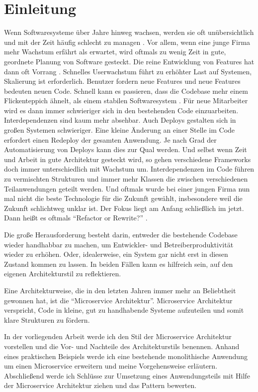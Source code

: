 \chapter{Einleitung}
Wenn Softwaresysteme über Jahre hinweg wachsen, werden sie oft unübersichtlich und mit der Zeit häufig schlecht zu managen \cite{infaktuell}. Vor allem, wenn eine junge Firma mehr Wachstum erfährt als erwartet, wird oftmals zu wenig Zeit in gute, geordnete Planung von Software gesteckt. Die reine Entwicklung von Features hat dann oft Vorrang \cite{mckinsey}. Schnelles Userwachstum führt zu erhöhter Last auf Systemen, Skalierung ist erforderlich. Benutzer fordern neue Features und neue Features bedeuten neuen Code. Schnell kann es passieren, dass die Codebase mehr einem Flickenteppich ähnelt, als einem stabilen Softwaresystem \cite[vgl.][Seite 7]{highsmith2013adaptive}. Für neue Mitarbeiter wird es dann immer schwieriger sich in den bestehenden Code einzuarbeiten. Interdependenzen sind kaum mehr absehbar. Auch Deploys gestalten sich in großen Systemen schwieriger. Eine kleine Änderung an einer Stelle im Code erfordert einen Redeploy der gesamten Anwendung. Je nach Grad der Automatisierung von Deploys kann dies zur Qual werden. Und selbst wenn Zeit und Arbeit in gute Architektur gesteckt wird, so gehen verschiedene Frameworks doch immer unterschiedlich mit Wachstum um. Interdependenzen im Code führen zu vermischten Strukturen und immer mehr Klassen die zwischen verschiedenen Teilanwendungen geteilt werden. Und oftmals wurde bei einer jungen Firma nun mal nicht die beste Technologie für die Zukunft gewählt, insbesondere weil die Zukunft schlichtweg unklar ist. Der Fokus liegt am Anfang schließlich im jetzt. Dann heißt es oftmals \enquote{Refactor or Rewrite?} \cite[vgl.][]{refactorrewrite}.

Die große Herausforderung besteht darin, entweder die bestehende Codebase wieder handhabbar zu machen, um Entwickler- und Betreiberproduktivität wieder zu erhöhen. Oder, idealerweise, ein System gar nicht erst in diesen Zustand kommen zu lassen. In beiden Fällen kann es hilfreich sein, auf den eigenen Architekturstil zu reflektieren.

Eine Architekturweise, die in den letzten Jahren immer mehr an Beliebtheit gewonnen hat, ist die \enquote{Microservice Architektur}. Microservice Architektur verspricht, Code in kleine, gut zu handhabende Systeme aufzuteilen und somit klare Strukturen zu fördern.

In der vorliegenden Arbeit werde ich den Stil der Microservice Architektur vorstellen und die Vor- und Nachteile des Architekturstils benennen. Anhand eines praktischen Beispiels werde ich eine bestehende monolithische Anwendung um einen Microservice erweitern und meine Vorgehensweise erläutern.
Abschließend werde ich Schlüsse zur Umsetzung eines Anwendungsteils mit Hilfe der Microservice Architektur ziehen und das Pattern bewerten.